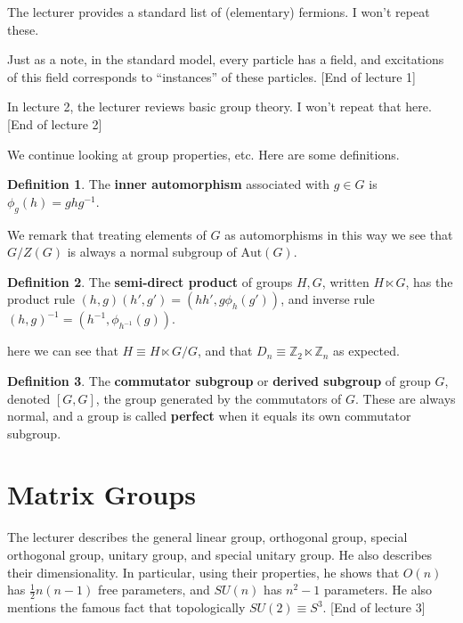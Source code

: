 \documentclass{article}
\theoremstyle{definition}
\newtheorem{definition}{Definition}
\begin{document}
The lecturer provides a standard list of (elementary) fermions. I won't repeat
these.

Just as a note, in the standard model, every particle has a field, and
excitations of this field corresponds to ``instances'' of these particles.
[End of lecture 1]

In lecture 2, the lecturer reviews basic group theory. I won't repeat that here.
[End of lecture 2]

We continue looking at group properties, etc. Here are some definitions.

\begin{definition}
  The \textbf{inner automorphism} associated with $g \in G$ is $\phi_g(h) =
  ghg^{-1}$.
\end{definition}

We remark that treating elements of $G$ as automorphisms in this way we see that
$G / Z(G)$ is always a normal subgroup of $\text{Aut}(G)$.

\begin{definition}
  The \textbf{semi-direct product} of groups $H, G$, written $H \ltimes G$, has the
  product rule $(h, g)(h', g') = (hh', g\phi_h(g'))$, and inverse rule $(h,
  g)^{-1} = (h^{-1}, \phi_{h^{-1}}(g))$.
\end{definition}

here we can see that $H \equiv H \ltimes G / G$, and that $D_n \equiv
\mathbb{Z}_2 \ltimes \mathbb{Z}_n$ as expected.

\begin{definition}
  The \textbf{commutator subgroup} or \textbf{derived subgroup} of group $G$, denoted $[G, G]$,
  the group generated by the commutators of $G$. These are always normal, and a
  group is called \textbf{perfect} when it equals its own commutator subgroup.
\end{definition}

\section{Matrix Groups}

The lecturer describes the general linear group, orthogonal group, special
orthogonal group, unitary group, and special unitary group. He also describes
their dimensionality. In particular, using their properties, he shows that
$O(n)$ has $\frac{1}{2}n(n - 1)$ free parameters, and $SU(n)$ has $n^2 - 1$
parameters. He also mentions the famous fact that topologically $SU(2) \equiv
S^3$. [End of lecture 3]
\end{document}
